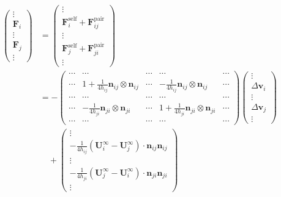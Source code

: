 \documentclass[12pt]{article}
\begin{document}
\begin{align}
\begin{pmatrix}
\vdots \\ \bm{F}_i \\ \vdots \\ \bm{F}_j \\  \vdots  
\end{pmatrix}
& =
\begin{pmatrix}
\vdots \\
\bm{F}_{i}^{\mathrm{self}} +  \bm{F}_{ij}^{\mathrm{pair}}  
\\ \vdots \\ 
\bm{F}_{j}^{\mathrm{self}} +  \bm{F}_{ji}^{\mathrm{pair}}  
\\  \vdots  
\end{pmatrix} \\
&=
-
\begin{pmatrix}
\cdots & \cdots & \cdots & \cdots & \cdots\\
\cdots & 1 + \frac{1}{4h_{ij}}\bm{n}_{ij} \otimes \bm{n}_{ij}  
& \cdots & -\frac{1}{4h_{ij}}\bm{n}_{ij} \otimes \bm{n}_{ij}   & \cdots\\
\cdots & \cdots & \cdots & \cdots & \cdots\\
\cdots & -\frac{1}{4h_{ji}}\bm{n}_{ji} \otimes \bm{n}_{ji} & \cdots 
& 1 + \frac{1}{4h_{ji}}\bm{n}_{ji} \otimes \bm{n}_{ji} 
 & \cdots \\
\cdots & \cdots & \cdots & \cdots & \cdots 
\end{pmatrix}
\begin{pmatrix}
\vdots \\
\Delta \bm{v}_i \\ 
\vdots \\
\Delta \bm{v}_j \\
\vdots 
\end{pmatrix} \\
& \quad 
+ 
\begin{pmatrix}
\vdots \\
-\frac{1}{4h_{ij}} (\bm{U}_i^{\infty}-\bm{U}_j^{\infty})\cdot\bm{n}_{ij} \bm{n}_{ij} \\
\vdots \\
-\frac{1}{4h_{ji}} (\bm{U}_j^{\infty}-\bm{U}_i^{\infty})\cdot\bm{n}_{ji} \bm{n}_{ji} \\
\vdots 
\end{pmatrix} 
\end{align}






\newpage

\end{document}
